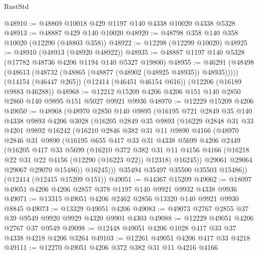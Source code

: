 \begin{lexlean}{RustStd}
\begin{coremodule}
@48910 := @48869 @10018 @429 @1197 @140 @4338 @10020 @4338 @5328
@48913 := @48887 @429 @140 @10020
@48920 := @48798 @358 @140 @358 @10020 (@12290 (@48803 @358))
@48922 := @12298 (@12299 @10020)
@48925 := @48910 (@48913 (@48920 @48922))
@48935 := @48887 @1197 @140 @5328 (@17782 @48736 @4206 @1194 @140 @5327 @19800)
@48955 := @46291
    (@48498 (@48613 (@48732 (@48865 (@48877 (@48902 (@48925 @48935)) @48935)))))
    (@14154 (@46447 @265))
    (@12414 (@46451 @46154 @616))
    (@12206 (@16189 @9883 @46288))
@48968 := @12212 @15209 @4206 @4206 @151 @140 @2850 @2860 @140 @9895 @151 @5027 @9921 @9936
@48970 := @12229 @15209 @4206
@49050 := @48968
    (@48970
      @2850
      @140
      @9895
      (@16195
        @721
        @2849
        @35
        @140
        @4338
        @9893
        @4206
        @3028
        (@16205
          @2849
          @35
          @9893
          (@16229
            @2848
            @31
            @33
            @4201
            @9892
            @16242
            (@16210
              @2846
              @382
              @31
              @11
              @9890
              @4166
              (@48970
                @2846
                @31
                @9890
                (@16195
                  @655
                  @417
                  @33
                  @31
                  @4338
                  @5699
                  @4206
                  @2449
                  (@16205
                    @417
                    @33
                    @5699
                    (@16210
                      @372
                      @382
                      @31
                      @11
                      @4156
                      @4166
                      (@16218 @22 @31 @22 @4156 (@12290 (@16223 @22)) @12318)
                      @16245))
                  @29061
                  @29064
                  @29067
                  @29070
                  @15486))
              @16245)))
        @35494
        @35497
        @35500
        @35503
        @15486))
    (@12414 (@12415 @15209 @151))
@49051 := @44367 @15209
@49062 := @18097 @49051 @4206 @4206 @2857 @378 @1197 @140 @9921 @9932 @4338 @9936
@49071 := @13315 @49051 @4206 @2462 @2856 @13320 @140 @9921 @9930 @8845
@49073 := @13329 @49051 @4206
@49083 := @49073 @2767 @2855 @37 @39 @9549 @9920 @9929 @4320 @9901 @4303
@49088 := @12229 @49051 @4206 @2767 @37 @9549
@49098 := @12448 @49051 @4206 @1028 @417 @33 @37 @4338 @4218 @4206 @3264
@49103 := @12261 @49051 @4206 @417 @33 @4218
@49111 := @12270 @49051 @4206 @372 @382 @31 @11 @4216 @4166

\end{coremodule}
\end{lexlean}
